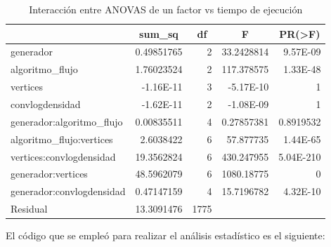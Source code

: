 \documentclass{article}
\begin{document}
\begin{table}[htbp]
  \centering
  \caption{Interacción entre ANOVAS de un factor vs tiempo de ejecución}
    \begin{tabular}{lrrrr}
    \toprule
          & \multicolumn{1}{c}{\textbf{sum\_sq}} & \multicolumn{1}{c}{\textbf{df}} & \multicolumn{1}{c}{\textbf{F}} & \multicolumn{1}{c}{\textbf{PR(>F)}} \\
    \midrule
    generador & 0.49851765 & 2     & 33.2428814 & 9.57E-09 \\
    algoritmo\_flujo & 1.76023524 & 2     & 117.378575 & 1.33E-48 \\
    vertices & -1.16E-11 & 3     & -5.17E-10 & 1 \\
    convlogdensidad & -1.62E-11 & 2     & -1.08E-09 & 1 \\
    generador:algoritmo\_flujo & 0.00835511 & 4     & 0.27857381 & 0.8919532 \\
    algoritmo\_flujo:vertices & 2.6038422 & 6     & 57.877735 & 1.44E-65 \\
    vertices:convlogdensidad & 19.3562824 & 6     & 430.247955 & 5.04E-210 \\
    generador:vertices & 48.5962079 & 6     & 1080.18775 & 0 \\
    generador:convlogdensidad & 0.47147159 & 4     & 15.7196782 & 4.32E-10 \\
    Residual & 13.3091476 & 1775  &       &  \\
    \bottomrule
    \end{tabular}%
  \label{tab:addlabel}%
\end{table}%

El código que se empleó para realizar el análisis estadístico es el siguiente:

\newpage








\end{document}
